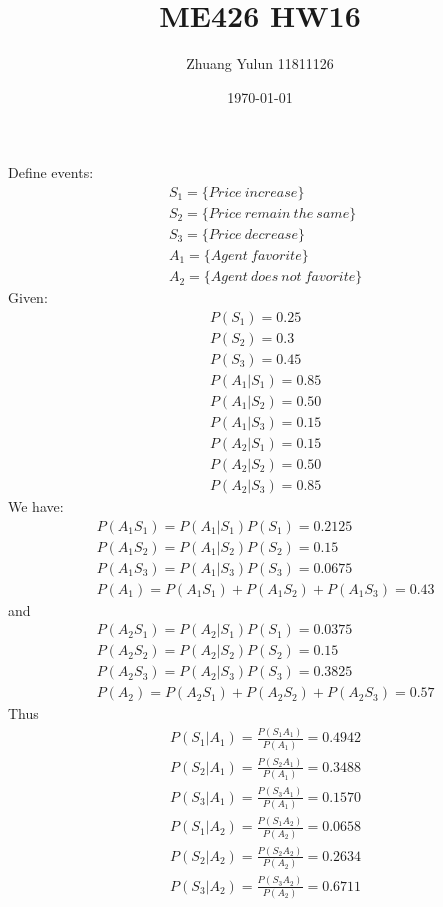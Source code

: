 \documentclass{article}
\title{ME426 HW16}
\author{Zhuang Yulun 11811126}
\date{\today}
\begin{document}
\maketitle
\section{}
Define events:
\begin{align*}
    &S_1=\{Price\ increase\}\\
    &S_2=\{Price\ remain\ the\ same\}\\
    &S_3=\{Price\ decrease\}\\
    &A_1=\{Agent\ favorite\}\\
    &A_2=\{Agent\ does\ not\ favorite\}    
\end{align*}
Given:
\begin{align*}
    &P(S_1)=0.25\\
    &P(S_2)=0.3\\
    &P(S_3)=0.45\\
    &P(A_1|S_1)=0.85\\
    &P(A_1|S_2)=0.50\\
    &P(A_1|S_3)=0.15\\
    &P(A_2|S_1)=0.15\\
    &P(A_2|S_2)=0.50\\
    &P(A_2|S_3)=0.85
\end{align*}
We have:
\begin{align*}
    &P(A_1S_1)=P(A_1|S_1)P(S_1)=0.2125\\
    &P(A_1S_2)=P(A_1|S_2)P(S_2)=0.15\\
    &P(A_1S_3)=P(A_1|S_3)P(S_3)=0.0675\\
    &P(A_1)=P(A_1S_1)+P(A_1S_2)+P(A_1S_3)=0.43
\end{align*}
and
\begin{align*}
    &P(A_2S_1)=P(A_2|S_1)P(S_1)=0.0375\\
    &P(A_2S_2)=P(A_2|S_2)P(S_2)=0.15\\
    &P(A_2S_3)=P(A_2|S_3)P(S_3)=0.3825\\
    &P(A_2)=P(A_2S_1)+P(A_2S_2)+P(A_2S_3)=0.57
\end{align*}
Thus
\begin{align*}
    &P(S_1|A_1)=\frac{P(S_1A_1)}{P(A_1)}=0.4942\\
    &P(S_2|A_1)=\frac{P(S_2A_1)}{P(A_1)}=0.3488\\
    &P(S_3|A_1)=\frac{P(S_3A_1)}{P(A_1)}=0.1570\\
    &P(S_1|A_2)=\frac{P(S_1A_2)}{P(A_2)}=0.0658\\
    &P(S_2|A_2)=\frac{P(S_2A_2)}{P(A_2)}=0.2634\\
    &P(S_3|A_2)=\frac{P(S_3A_2)}{P(A_2)}=0.6711
\end{align*}
\end{document}
